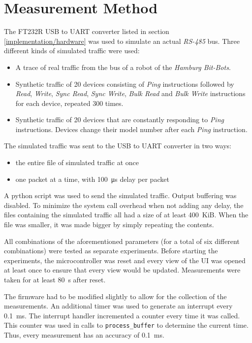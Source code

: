 \section{Measurement Method}
\label{evaluation/measurement-method}

The FT232R USB to UART converter listed in section \ref{implementation/hardware} was used to simulate
an actual \textit{RS-485} bus. Three different kinds of simulated traffic were used:

\begin{itemize}
    \item A trace of real traffic from the bus of a robot of the \textit{Hamburg Bit-Bots}.
    \item Synthetic traffic of 20 devices consisting of \textit{Ping} instructions followed by
          \textit{Read}, \textit{Write}, \textit{Sync Read}, \textit{Sync Write}, \textit{Bulk Read}
          and \textit{Bulk Write} instructions for each device, repeated 300 times.
    \item Synthetic traffic of 20 devices that are constantly responding to \textit{Ping} instructions.
          Devices change their model number after each \textit{Ping} instruction.
\end{itemize}

The simulated traffic was sent to the USB to UART converter in two ways:

\begin{itemize}
    \item the entire file of simulated traffic at once
    \item one packet at a time, with \SI{100}{\micro\second} delay per packet
\end{itemize}

A python script was used to send the simulated traffic. Output buffering was disabled. To minimize
the system call overhead when not adding any delay, the files containing the simulated traffic all
had a size of at least \SI{400}{KiB}. When the file was smaller, it was made bigger by simply
repeating the contents.

All combinations of the aforementioned parameters (for a total of six different combinations) were
tested as separate experiments. Before starting the experiments, the microcontroller was reset and
every view of the UI was opened at least once to ensure that every view would be updated. Measurements
were taken for at least \SI{80}{\second} after reset.

The firmware had to be modified slightly to allow for the collection of the measurements. An additional
timer was used to generate an interrupt every \SI{0.1}{\milli\second}. The interrupt handler incremented
a counter every time it was called. This counter was used in calls to \lstinline{process_buffer} to
determine the current time. Thus, every measurement has an accuracy of \SI{0.1}{\milli\second}.

